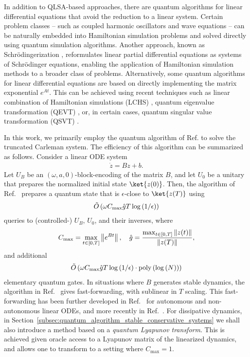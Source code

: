 \documentclass[superscriptaddress,onecolumn,nofootinbib,longbibliography,a4paper,accepted=2026-09-29]{quantumarticle}
\theoremstyle{plain}
\theoremstyle{definition}
\numberwithin{thm}{section}
\numberwithin{assumption}{section}
\numberwithin{lemma}{section}
\numberwithin{prop}{section}
\numberwithin{cor}{section}
\numberwithin{definition}{section}
\numberwithin{rmk}{section}
\numberwithin{equation}{section}
\newcommand{\norm}[1]     {\left\| #1 \right\|}
\newcommand{\lrb}[1]{\left ( #1 \right )}
\newcommand{\mypoly}[1]{\operatorname{poly} \lrb{#1}}
\newcommand{\mylog}[1]{\operatorname{log} \lrb{#1}}
\newcommand{\mytO}[1]{\tilde{O}\lrb{#1}}
\begin{document}
In addition to QLSA-based approaches, there are quantum algorithms for linear differential equations that avoid the reduction to a linear system. Certain problem classes -- such as coupled harmonic oscillators \cite{babbush2023exponential} and wave equations \cite{costa2019quantum} -- can be naturally embedded into Hamiltonian simulation problems and solved directly using quantum simulation algorithms. Another approach, known as Schr\"{o}dingerization \cite{jin2024quantum, jin2023quantum}, reformulates linear partial differential equations as systems of Schr\"{o}dinger equations, enabling the application of Hamiltonian simulation methods to a broader class of problems. Alternatively, some quantum algorithms for linear differential equations are based on directly implementing the matrix exponential $e^{At}$. This can be achieved using recent techniques such as linear combination of Hamiltonian simulations (LCHS) \cite{an2023linear, an2023quantum}, quantum eigenvalue transformation (QEVT) \cite{low2024quantum}, or, in certain cases, quantum singular value transformation (QSVT) \cite{fang2023timemarchingbased, an2025quantum}.

In this work, we primarily employ the quantum algorithm of Ref. \cite{jennings2023cost} to solve the truncated Carleman system. The efficiency of this algorithm can be summarized as follows. Consider a linear ODE system
\begin{align}
    \dot{z} = B z + b.
\end{align}
Let $U_B$ be an $(\omega, a, 0)$-block-encoding of the matrix $B$, and let $U_0$ be a unitary that prepares the normalized initial state $\ket{z(0)}$. Then, the algorithm of Ref.~\cite{jennings2023cost} prepares a quantum state that is $\epsilon$-close to $\ket{z(T)}$ using
$$\mytO{\omega C_{\rm max}\hat{g}T\mylog{1/\epsilon}}$$
queries to (controlled-) $U_B$, $U_0$, and their inverses, where 
\begin{align}
C_{\rm max} = \max_{t \in [0,T]} \norm{e^{Bt}},~~~\hat{g}=\frac{\max_{t \in [0,T]} \norm{z(t)}}{\norm{z(T)}},
\end{align}
and additional
$$\mytO{\omega C_{\rm max}\hat{g}T\mylog{1/\epsilon}\cdot \mypoly{\mylog{N}}}$$
elementary quantum gates. In situations where $B$ generates stable dynamics, the algorithm in Ref.~\cite{jennings2023cost} gives fast-forwarding, with sublinear in $T$ scaling. This fast-forwarding has been further developed in Ref.~\cite{an2024fast} for autonomous and non-autonomous linear ODEs, and more recently in Ref.~\cite{yang2025quantum}.  For dissipative dynamics, in Section~\ref{subsec:quantum_algorithm_stable_conservative_systems} we shall also introduce a method based on a \emph{quantum Lyapunov transform}. This is achieved given oracle access to a Lyapunov matrix of the linearized dynamics, and allows one to transform to a setting where $C_{\max}=1$.
\end{document}
